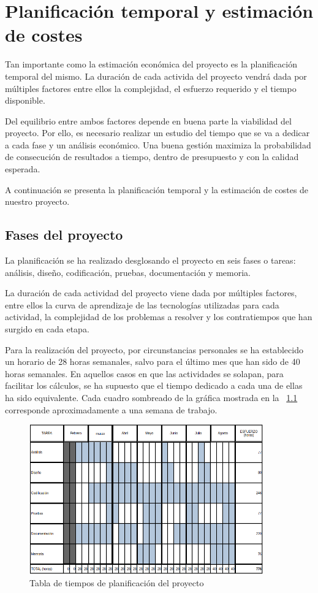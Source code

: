 \chapter{Planificación temporal y estimación de costes}
\label{chap:planificacion}

Tan importante como la estimación económica del proyecto es la planificación temporal del mismo. La duración de cada activida del proyecto vendrá dada por múltiples factores entre ellos la complejidad, el esfuerzo requerido y el tiempo disponible.

Del equilibrio entre ambos factores depende en buena parte la viabilidad del
proyecto. Por ello, es necesario realizar un estudio del tiempo que se va a dedicar a cada fase y un análisis económico. Una buena gestión maximiza la probabilidad de consecución de resultados a tiempo, dentro de presupuesto y con la calidad esperada.

A continuación se presenta la planificación temporal y la estimación de costes de nuestro proyecto.

\section{Fases del proyecto} 

La planificación se ha realizado desglosando el proyecto en seis fases o tareas: análisis, diseño, codificación, pruebas, documentación y memoria. 

La duración de cada actividad del proyecto viene dada por múltiples factores, entre ellos la curva de aprendizaje de las tecnologías utilizadas para cada actividad, la complejidad de los problemas a resolver y los contratiempos que han surgido en cada etapa.

Para la realización del proyecto, por circunstancias personales se ha establecido un horario de 28 horas semanales, salvo para el último mes que han sido de 40 horas semanales. En aquellos casos en que las actividades se solapan, para facilitar los cálculos, se ha supuesto que el tiempo dedicado a cada una de ellas ha sido equivalente. Cada cuadro sombreado de la gráfica mostrada en la \figurename~\ref{fig:planificacion} corresponde aproximadamente a una semana de trabajo.


\begin{figure}[H]
  \centering
  \includegraphics[width=0.9\textwidth]{imaxes/planificacion.png}
  \caption{Tabla de tiempos de planificación del proyecto}
  \label{fig:planificacion}
\end{figure}


